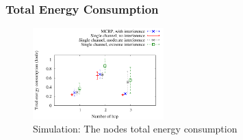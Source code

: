 \subsubsection{Total Energy Consumption}

\begin{figure}
\centering
\includegraphics[width=0.45\textwidth]{figures/totalEnergy.pdf}
\caption{Simulation: The nodes total energy consumption}
\label{fig:allNodesEnergy}
\end{figure}



